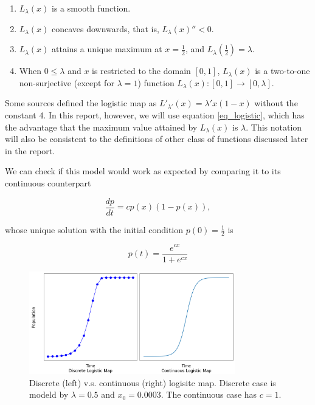 \documentclass{report}
\theoremstyle{definition}
\theoremstyle{definition}
\theoremstyle{remark}
\renewcommand{\L}{L_{\lambda}(x)}
\begin{document}
\begin{enumerate}
	\item $\L$ is a smooth function.
	\item $\L$ concaves downwards, that is, $\L'' < 0$.
	\item $\L$ attains a unique maximum at $x = \frac{1}{2}$, and $L_{\lambda}(\frac{1}{2}) = \lambda$.
	\item When $0 \leq \lambda$ and $x$ is restricted to the domain $[0, 1]$, $\L$ is a two-to-one non-surjective (except for $\lambda = 1$) function $\L: [0,1] \rightarrow [0,\lambda]$. 
\end{enumerate}

Some sources defined the logistic map as $L'_{\lambda'}(x) = \lambda' x(1-x)$ without the constant 4. 
In this report, however, we will use equation \ref{eq_logistic}, which has the advantage that the maximum value attained by $\L$ is $\lambda$. This notation will also be consistent to the definitions of other class of functions discussed later in the report.

We can check if this model would work as expected by comparing it to its continuous counterpart 

\begin{equation}\label{eq_logistic_continuous}
	\frac{dp}{dt} = c p(x) (1-p(x)),
\end{equation}

whose unique solution with the initial condition $p(0) = \frac{1}{2}$ is 

$$
p(t) = \frac{e^{cx}}{1+e^{cx}}
$$

\begin{figure}[b!]
	\centering
	\label{fig:con_vs_discrete}
	\includegraphics[width=0.8\textwidth]{./figures/con_vs_discrete_logistic_map.png}
	\caption{Discrete (left) v.s. continuous (right) logisitc map. Discrete case is modeld by $\lambda = 0.5$ and $x_0 = 0.0003$. The continuous case has $c=1$.}
\end{figure}
\end{document}
